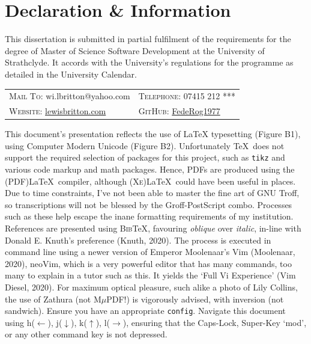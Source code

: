 \documentclass[11pt, english]{article}
\begin{document}
\newpage

	\section*{Declaration \& Information}

	This dissertation is submitted in partial fulfilment of the requirements for the degree of Master of Science Software Development at the University of Strathclyde. It accords with the University’s regulations for the programme as detailed in the University Calendar.

	\begin{center}
		\small
	\begin{tabular}{p{5.45cm}|p{5.45cm}}
		\textsc{Mail To:} wi.lbritton@yahoo.com & \textsc{Telephone:} 07415 212 ***\\
		\textsc{Website:} \href{http://lewisbritton.com}{lewisbritton.com} & \textsc{GitHub:} \href{https://github.com/FedeRog1977}{FedeRog1977}\\
	\end{tabular}
	\end{center}

	This document’s presentation reflects the use of {\LaTeX} typesetting (Figure B1), using Computer Modern Unicode (Figure B2). Unfortunately {\TeX}\ does not support the required selection of packages for this project, such as \texttt{tikz} and various code markup and math packages. Hence, PDFs are produced using the (PDF){\LaTeX}\ compiler, although (\textsc{Xe}){\LaTeX}\ could have been useful in places. Due to time constraints, I've not been able to master the fine art of GNU Troff, so transcriptions will not be blessed by the Groff-PostScript combo. Processes such as these help escape the inane formatting requirements of my institution. References are presented using \textsc{Bib}{\TeX}, favouring \textsl{oblique} over \textit{italic}, in-line with Donald E. Knuth’s preference (Knuth, 2020). The process is executed in command line using a newer version of Emperor Moolenaar's Vim (Moolenaar, 2020), neoVim, which is a very powerful editor that has many commands, too many to explain in a tutor such as this. It yields the `Full Vi Experience' (Vim Diesel, 2020). For maximum optical pleasure, such alike a photo of Lily Collins, the use of Zathura (not M$\mu$PDF!) is vigorously advised, with inversion (not sandwich). Ensure you have an appropriate \texttt{config}. Navigate this document using h($\leftarrow$), j($\downarrow$), k($\uparrow$), l($\rightarrow$), ensuring that the Caps-Lock, Super-Key `mod', or any other command key is not depressed.\\
\end{document}
